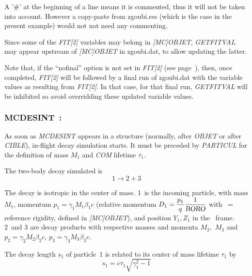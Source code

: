 \noindent A '\#' at the beginning of a line means it is commented, thus it will not be taken into account. 
However a copy-paste from zgoubi.res (which is the case in the present example) would not not need any commenting. 

\medskip

\noindent Since some of the \textsl{FIT[2]} variables may belong in \textsl{[MC]OBJET}, \textsl{GETFITVAL} may appear 
upstream of  \textsl{[MC]OBJET} in zgoubi.dat, to allow updating the latter. 

\medskip

Note that, if the ``nofinal'' option  
is not set in \textsl{FIT[2]} (see page~\pageref{nofinal}), then, once completed, \textsl{FIT[2]} will be followed by a final  
run of zgoubi.dat with the variable values as resulting from \textsl{FIT[2]}. In that case, for that final run, 
\textsl{GETFITVAL} will be inhibited so avoid overridding these updated variable values. 


\newpage

\subsubsection*{MCDESINT~: \MCDESINTTitl \protect\cite{Biblio11}}
\medskip 
\label{MCDESINT}

 As soon as \textsl{MCDESINT}  appears in a structure
(normally, after \textsl{OBJET} or after \textsl{CIBLE}),
 in-flight decay simulation starts. 
It must be preceded by \textsl{PARTICUL} for the definition of mass $ M_1 $ 
and \textsl{COM} 
lifetime $\tau_1$. 

\noindent The two-body decay simulated is 
 $$ 1 \longrightarrow  2+3 $$

\noindent The decay is isotropic in the center of mass. 
1~is the incoming particle, with mass $ M_1 $, momentum $ p_1=\gamma_1 M_1\beta_ 1c $ (relative 
momentum $ D_1= \dfrac{p_1 }{ q} \dfrac{1 }{\textsl{BORO}} $ with \BORO\   = reference
rigidity, defined in \textsl{[MC]OBJET}),  and position $ Y_1,Z_1 $ in the \zgou\ frame. 
2~and 3 are decay products with respective masses and momenta $ M_2, $ $ M_3 $ and 
$ p_2=\gamma_ 2M_2\beta_2c$,  $ p_3=\gamma_ 3M_3\beta_ 3c$.  

\noindent The decay length  $ s_1 $ of particle~1 is related to its center of 
mass lifetime $ \tau_ 1 $ by 
$$ s_1=c\tau_ 1 \sqrt{ \gamma^ 2_1 -1} $$

